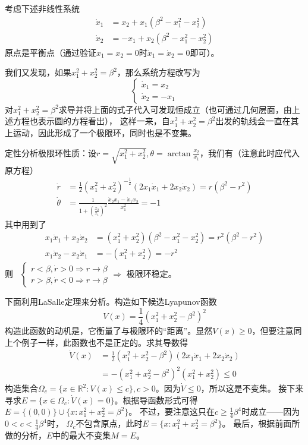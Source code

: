 \begin{example}[收敛至极限环]
	考虑下述非线性系统\begin{align*}
		\dot{x}_1&=x_2+x_1(\beta^2-x_1^2-x_2^2)\\
		\dot{x}_2&=-x_1+x_2(\beta^2-x_1^2-x_2^2)
	\end{align*}
	原点是平衡点（通过验证$x_1=x_2=0$时$\dot{x}_1=\dot{x}_2=0$即可）。

	我们又发现，如果$x_1^2+x_2^2=\beta^2$，那么系统方程改写为\[\left\{\begin{array}{l}
    \dot{x}_1 = x_2\\
    \dot{x}_2 = - x_1
  \end{array}\right.\]
  对$x_1^2+x_2^2=\beta^2$求导并将上面的式子代入可发现恒成立（也可通过几何层面，由上述方程也表示圆的方程看出），
  这样一来，自$x_1^2+x_2^2=\beta^2$出发的轨线会一直在其上运动，因此形成了一个极限环，同时也是不变集。

  \begin{note}
    定性分析极限环性质：设$r = \sqrt{x^2_1 + x^2_2}, \theta = \arctan \frac{x_2}{x_1}$，我们有（注意此时应代入原方程）
  \begin{align*}
    \dot{r}& = \frac{1}{2}(x_{1}^{2}+x_{2}^{2})^{-\frac{1}{2}}(2x_{1}\dot{x}_{1}+2x_{2}\dot{x}_{2})= r (\beta^2 - r^2)\\
    \dot{\theta} & =\frac{1}{1+(\frac{x_{2}}{x_{1}})^{2}}\frac{\dot{x}_{2}x_{1}-\dot{x}_{1}x_{2}}{x_{1}^{2}}= - 1
  \end{align*}
  其中用到了
  \begin{align*}
    x_1\dot{x}_1+x_2\dot{x}_2& = (x_1^2+x_2^2)(\beta^2-x_1^2-x_2^2)= r^2 (\beta^2 - r^2)\\
    x_1\dot{x}_2-x_2\dot{x}_1 & = -(x_1^2+x_2^2)=- r^2
  \end{align*}
  则 \ $\left\{\begin{array}{l}
    r < \beta, \dot{r} > 0 \Rightarrow r \rightarrow \beta\\
    r > \beta, \dot{r} < 0 \Rightarrow r \rightarrow \beta
  \end{array}\right. \Rightarrow$ 极限环稳定。
\end{note}

  下面利用LaSalle定理来分析。构造如下候选Lyapunov函数\[ V (x) = \frac{1}{4} (x^2_1 + x^2_2 - \beta^2)^2 \]
  构造此函数的动机是，它衡量了与极限环的“距离”。显然$V (x) \geq 0$，但要注意同上个例子一样，此函数也不是正定的。求其导数得
  \begin{align*}
    \dot{V} (x) & =  \frac{1}{2} (x^2_1 + x^2_2 - \beta^2) (2 x_1 \dot{x}_1 +
    2 x_2 \dot{x}_2)\\
    & =  - (x^2_1 + x^2_2 - \beta^2)^2 (x^2_1 + x^2_2)\leq 0
  \end{align*}
  构造集合$\Omega_c =
  \{ x \in \mathbb{R}^2 : V (x) \leq c \},c > 0$。因为$\dot{V} \leq 0$，所以这是不变集。
  接下来寻求$E = \{ x \in \Omega_c : \dot{V} (x) = 0 \}$。根据导函数形式可得$E = \{
  (0, 0) \} \cup \{ x : x^2_1 + x^2_2 = \beta^2 \}$。
  不过，要注意这只在$c \ge \frac{1}{4} \beta^4$时成立——因为$0 < c < \frac{1}{4} \beta^4$时，
  $\Omega_c $不包含原点，此时$E=\{ x : x^2_1 + x^2_2 = \beta^2 \}$。
  最后，根据前面所做的分析，$E$中的最大不变集$M = E$。
  

\end{example}

